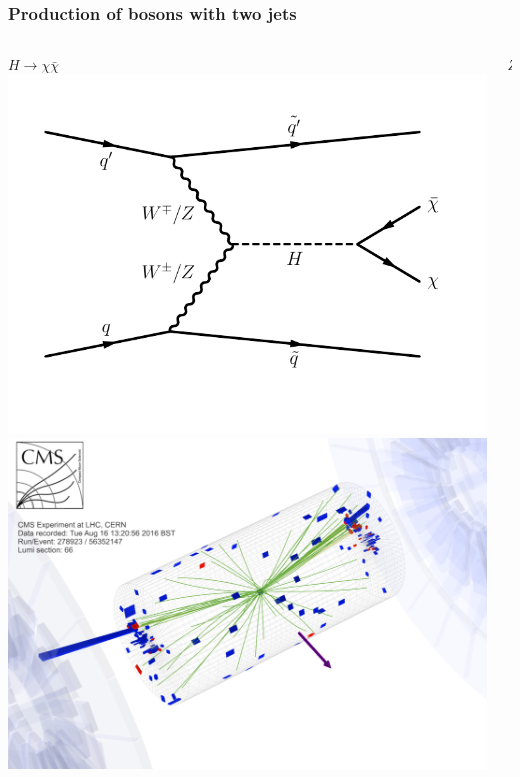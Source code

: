 \documentclass[aspectratio=169,xcolor=dvipsnames,,table,compress]{beamer}
\begin{document}
\begin{frame}   \frametitle{Production of bosons with two jets}
  \vspace{-5mm}
  \begin{columns}[T]
    \begin{column}{0.33\textwidth}
      \centering
      $H\rightarrow\chi\bar\chi$ \\
      \includegraphics[width=\textwidth]{../figures/vbf/diagrams/vbf_hinv.pdf} \\
      \includegraphics[width=\textwidth]{../figures/vbf/misc/event_display.png}
    \end{column}
    \begin{column}{0.33\textwidth}
      \centering 
      $Z$ \\

\end{column}
\end{columns}
\end{frame}
\end{document}
